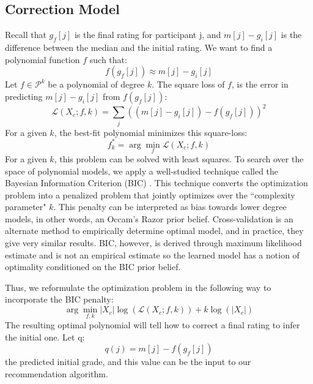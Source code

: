 \subsection{Correction Model}
Recall that $g_f[j]$ is the final rating for participant j, and $m[j] - g_i[j]$ is the difference between the median and the initial rating.
We want to find a polynomial function $f$ such that:
 \begin{equation} f(g_f[j]) 
 \approx m[j] - g_i[j]
 \end{equation}
Let $f\in \mathcal{P}^k$ be a polynomial of degree $k$.
The square loss of $f$, is the error in predicting $m[j] - g_i[j]$ from $f(g_f[j])$:
\begin{equation}
\mathcal{L}(X_c;f,k) = \sum_j ((m[j] - g_i[j]) - f(g_f[j]))^2 
\end{equation}
For a given $k$, the best-fit polynomial minimizes this square-loss:
\begin{equation}
f^*_k =\arg \min_f \mathcal{L}(X_c;f,k)
\end{equation}
For a given $k$, this problem can be solved with least squares.
To search over the space of polynomial models, we apply a well-studied technique called the Bayesian Information Criterion (BIC) \cite{schwarz1978estimating,burnham2002model}.
This technique converts the optimization problem into a penalized problem that jointly optimizes over the ``complexity parameter" $k$.
This penalty can be interpreted as bias towards lower degree models, in other words, an Occam's Razor prior belief. 
Cross-validation is an alternate method to empirically determine optimal model, and in practice, they give very similar results.
BIC, however, is derived through maximum likelihood estimate and is not an empirical estimate so the learned model has a notion of optimality conditioned on the BIC prior belief.

Thus, we reformulate the optimization problem in the following way to incorporate the BIC penalty:
\begin{equation}
\arg \min_{f,k} |X_c|\log(\mathcal{L}(X_c;f,k)) + k\log(|X_c|)
\end{equation}
The resulting optimal polynomial will tell how to correct a final rating to infer the initial one.
Let q:
\begin{equation}q(j) = m[j] - f(g_f[j])\end{equation}
the predicted initial grade, and this value can be the input to our recommendation algorithm.

